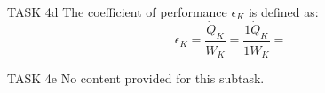 TASK 4d  
The coefficient of performance \( \epsilon_K \) is defined as:  
\[
\epsilon_K = \frac{\dot{Q}_K}{\dot{W}_K} = \frac{1\dot{Q}_K}{1\dot{W}_K} =
\]  

TASK 4e  
No content provided for this subtask.